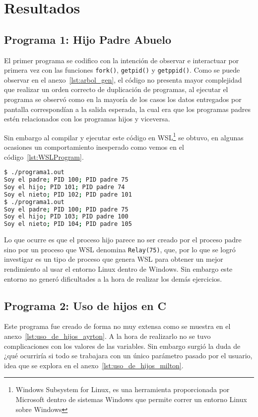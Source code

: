 \section{Resultados}
\subsection{Programa 1: Hijo Padre Abuelo}
El primer programa se codifico con la intención de observar e interactuar por primera vez con las funciones \verb|fork()|, \verb|getpid()| y \verb|getppid()|. Como se puede observar en el anexo~\ref{lst:arbol_gen}, el código no presenta mayor complejidad que realizar un orden correcto de duplicación de programas, al ejecutar el programa se observó como en la mayoría de los casos los datos entregados por pantalla correspondían a la salida esperada, la cual era que los programas padres estén relacionados con los programas hijos y viceversa.

Sin embargo al compilar y ejecutar este código en WSL\footnote{Windows Subsystem for Linux, es una herramienta proporcionada por Microsoft dentro de sistemas Windows que permite correr un entorno Linux sobre Windows} se obtuvo, en algunas ocasiones un comportamiento inesperado como vemos en el código~\ref{lst:WSLProgram}.
\begin{lstlisting}[language=bash, style=CodeStyle, caption={Programa Hijo Padre Abuelo en WSL}, label={lst:WSLProgram}]
$ ./programa1.out
Soy el padre; PID 100; PID padre 75
Soy el hijo; PID 101; PID padre 74
Soy el nieto; PID 102; PID padre 101
$ ./programa1.out
Soy el padre; PID 100; PID padre 75
Soy el hijo; PID 103; PID padre 100
Soy el nieto; PID 104; PID padre 105
\end{lstlisting}

Lo que ocurre es que el proceso hijo parece no ser creado por el proceso padre sino por un proceso que WSL denomina \verb|Relay(75)|, que, por lo que se logró investigar es un tipo de proceso que genera WSL para obtener un mejor rendimiento al usar el entorno Linux dentro de Windows. Sin embargo este entorno no generó dificultades a la hora de realizar los demás ejercicios.

\subsection{Programa 2: Uso de hijos en C}
Este programa fue creado de forma no muy extensa como se muestra en el anexo~\ref{lst:uso_de_hijos_ayrton}. A la hora de realizarlo no se tuvo complicaciones con los valores de las variables. Sin embargo surgió la duda de ¿qué ocurriría si todo se trabajara con un único parámetro pasado por el usuario, idea que se explora en el anexo~\ref{lst:uso_de_hijos_milton}.

